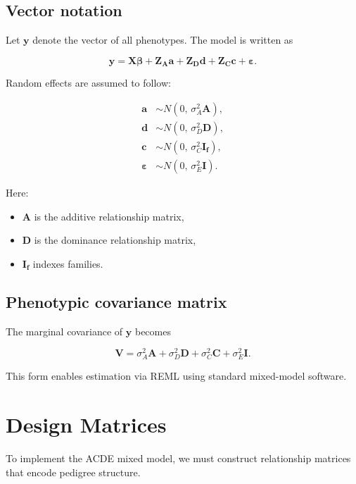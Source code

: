 \documentclass[11pt]{article}
\begin{document}
\subsection{Vector notation}

Let $\mathbf{y}$ denote the vector of all phenotypes.  
The model is written as

\begin{equation}
\mathbf{y} = \mathbf{X}\bm{\beta}
+ \mathbf{Z_A}\mathbf{a}
+ \mathbf{Z_D}\mathbf{d}
+ \mathbf{Z_C}\mathbf{c}
+ \bm{\varepsilon}.
\end{equation}

Random effects are assumed to follow:

\begin{align}
\mathbf{a} &\sim N(0,\,\sigma_A^2\mathbf{A}),\\
\mathbf{d} &\sim N(0,\,\sigma_D^2\mathbf{D}),\\
\mathbf{c} &\sim N(0,\,\sigma_C^2\mathbf{I_f}),\\
\bm{\varepsilon} &\sim N(0,\,\sigma_E^2\mathbf{I}).
\end{align}

Here:

\begin{itemize}
\item $\mathbf{A}$ is the additive relationship matrix,
\item $\mathbf{D}$ is the dominance relationship matrix,
\item $\mathbf{I_f}$ indexes families.
\end{itemize}

\subsection{Phenotypic covariance matrix}

The marginal covariance of $\mathbf{y}$ becomes

\begin{equation}
\mathbf{V} =
\sigma_A^2\mathbf{A}
+ \sigma_D^2\mathbf{D}
+ \sigma_C^2\mathbf{C}
+ \sigma_E^2\mathbf{I}.
\end{equation}

This form enables estimation via REML using standard mixed-model software.

\section{Design Matrices}

To implement the ACDE mixed model, we must construct relationship matrices 
that encode pedigree structure.
\end{document}
